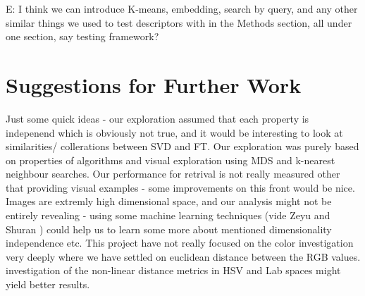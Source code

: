 \documentclass{report}
\begin{document}
E: I think we can introduce K-means, embedding, search by query, and any other similar things we used to test descriptors with in the Methods section, all under one section, say testing framework?


\chapter{Suggestions for Further Work}
Just some quick ideas - our exploration assumed that each property is indepenend which is obviously not true, and it would be interesting to look at similarities/ collerations between SVD and FT. 
Our exploration was purely based on properties of algorithms and visual exploration using MDS and k-nearest neighbour searches. Our performance for retrival is not really measured other that providing visual examples - some improvements on this front would be nice.
Images are extremly high dimensional space, and our analysis might not be entirely revealing - using some machine learning techniques (vide Zeyu and Shuran ) could help us to learn some more about mentioned dimensionality independence etc.
This project have not really focused on the color investigation very deeply where we have settled on euclidean distance between the RGB values. investigation of the non-linear distance metrics in HSV and Lab spaces might yield better results.
\end{document}
